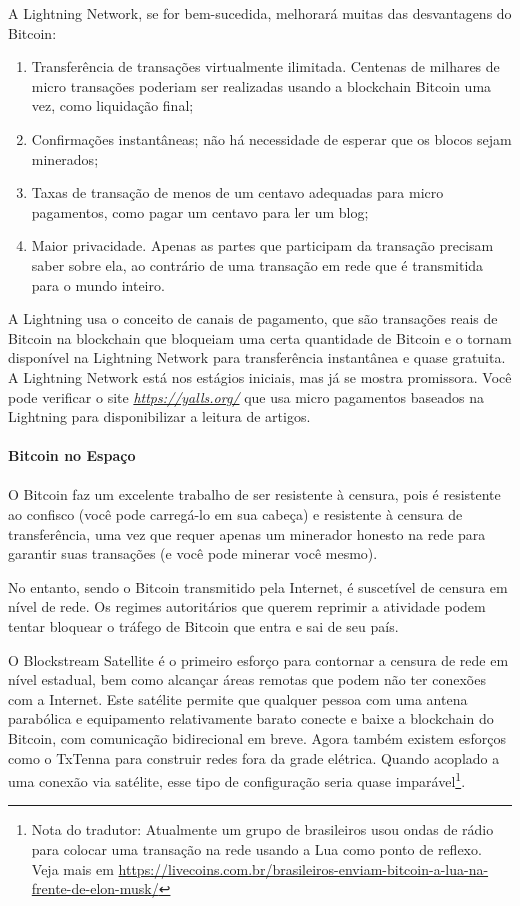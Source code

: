 A Lightning Network, se for bem-sucedida, melhorará muitas das desvantagens do Bitcoin:

\begin{enumerate}
\item Transferência de transações virtualmente ilimitada. Centenas de milhares de micro transações poderiam ser realizadas usando a blockchain Bitcoin uma vez, como liquidação final;
\item Confirmações instantâneas; não há necessidade de esperar que os blocos sejam minerados;
\item Taxas de transação de menos de um centavo adequadas para micro pagamentos, como pagar um centavo para ler um blog;
\item Maior privacidade. Apenas as partes que participam da transação precisam saber sobre ela, ao contrário de uma transação em rede que é transmitida para o mundo inteiro.
\end{enumerate}

A Lightning usa o conceito de canais de pagamento, que são transações reais de Bitcoin na blockchain que bloqueiam uma certa quantidade de Bitcoin e o tornam disponível na Lightning Network para transferência instantânea e quase gratuita. A Lightning Network está nos estágios iniciais, mas já se mostra promissora. Você pode verificar o site \textit{\url{https://yalls.org/}} que usa micro pagamentos baseados na Lightning para disponibilizar a leitura de artigos.

\paragraph{Bitcoin no Espaço}
\paragraph{}

O Bitcoin faz um excelente trabalho de ser resistente à censura, pois é resistente ao confisco (você pode carregá-lo em sua cabeça) e resistente à censura de transferência, uma vez que requer apenas um minerador honesto na rede para garantir suas transações (e você pode minerar você mesmo).

No entanto, sendo o Bitcoin transmitido pela Internet, é suscetível de censura em nível de rede. Os regimes autoritários que querem reprimir a atividade podem tentar bloquear o tráfego de Bitcoin que entra e sai de seu país.

O Blockstream Satellite é o primeiro esforço para contornar a censura de rede em nível estadual, bem como alcançar áreas remotas que podem não ter conexões com a Internet. Este satélite permite que qualquer pessoa com uma antena parabólica e equipamento relativamente barato conecte e baixe a blockchain do Bitcoin, com comunicação bidirecional em breve. Agora também existem esforços como o TxTenna para construir redes fora da grade elétrica. Quando acoplado a uma conexão via satélite, esse tipo de configuração seria quase imparável\footnote{Nota do tradutor: Atualmente um grupo de brasileiros usou ondas de rádio para colocar uma transação na rede usando a Lua como ponto de reflexo. Veja mais em \url{https://livecoins.com.br/brasileiros-enviam-bitcoin-a-lua-na-frente-de-elon-musk/}}.